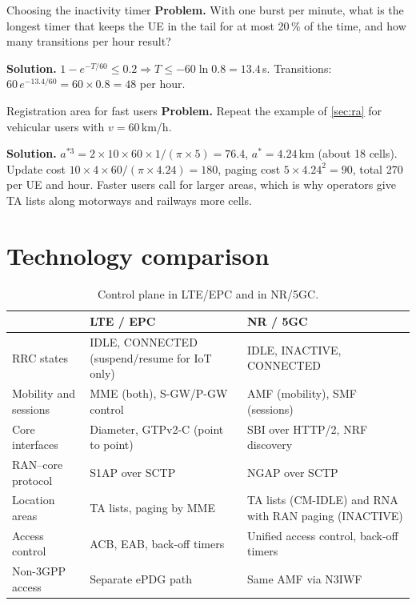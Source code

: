 \documentclass[11pt,a4paper]{article}
\begin{document}
\begin{examplebox}{Choosing the inactivity timer}\label{ex:timer}
\textbf{Problem.} With one burst per minute, what is the longest timer that keeps the UE in the tail for at most 20\,\% of the time, and how many
transitions per hour result?

\textbf{Solution.} $1 - e^{-T/60} \le 0.2 \Rightarrow T \le -60\ln 0.8 = 13.4$\,s. Transitions: $60\,e^{-13.4/60} = 60\times0.8 = 48$ per hour.
\end{examplebox}

\begin{examplebox}{Registration area for fast users}\label{ex:ra}
\textbf{Problem.} Repeat the example of \cref{sec:ra} for vehicular users with $v = 60$\,km/h.

\textbf{Solution.} $a^{*3} = 2\times10\times60\times1/(\pi\times5) = 76.4$, $a^{*} = 4.24$\,km (about 18 cells). Update cost $10\times4\times60/(\pi\times4.24) = 180$,
paging cost $5\times4.24^2 = 90$, total 270 per UE and hour. Faster users call for larger areas, which is why operators give TA lists along motorways
and railways more cells.
\end{examplebox}

\section{Technology comparison}
\begin{table}[htbp]
\centering\small
\caption{Control plane in LTE/EPC and in NR/5GC.}\label{tab:cmp}
\begin{tabularx}{\linewidth}{@{}l Y Y@{}}
\toprule
{} & LTE / EPC & NR / 5GC \\
\midrule
RRC states         & IDLE, CONNECTED (suspend/resume for IoT only) & IDLE, INACTIVE, CONNECTED \\
Mobility and sessions & MME (both), S-GW/P-GW control & AMF (mobility), SMF (sessions) \\
Core interfaces    & Diameter, GTPv2-C (point to point) & SBI over HTTP/2, NRF discovery \\
RAN--core protocol & S1AP over SCTP                  & NGAP over SCTP \\
Location areas     & TA lists, paging by MME          & TA lists (CM-IDLE) and RNA with RAN paging (INACTIVE) \\
Access control     & ACB, EAB, back-off timers       & Unified access control, back-off timers \\
Non-3GPP access    & Separate ePDG path                & Same AMF via N3IWF \\
\bottomrule
\end{tabularx}
\end{table}
\end{document}
